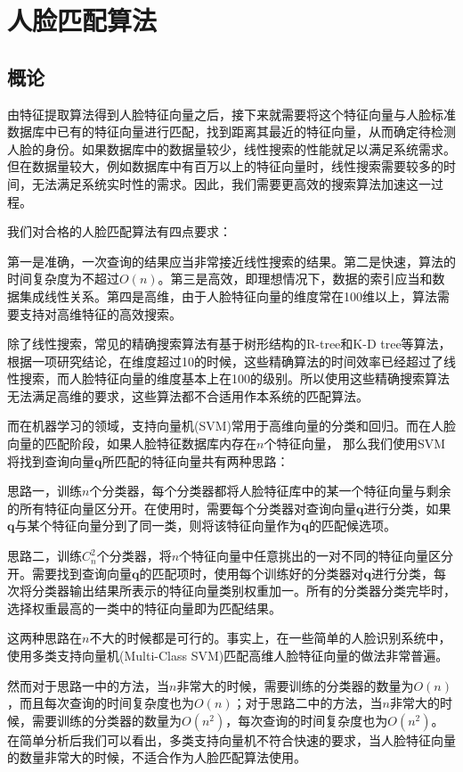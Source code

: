 \chapter{人脸匹配算法}

\section{概论}

由特征提取算法得到人脸特征向量之后，接下来就需要将这个特征向量与人脸标准数据库中已有的特征向量进行匹配，找到距离其最近的特征向量，从而确定待检测人脸的身份。如果数据库中的数据量较少，线性搜索的性能就足以满足系统需求。但在数据量较大，例如数据库中有百万以上的特征向量时，线性搜索需要较多的时间，无法满足系统实时性的需求。因此，我们需要更高效的搜索算法加速这一过程。

我们对合格的人脸匹配算法有四点要求：

第一是准确，一次查询的结果应当非常接近线性搜索的结果。第二是快速，算法的时间复杂度为不超过$O(n)$。第三是高效，即理想情况下，数据的索引应当和数据集成线性关系。第四是高维，由于人脸特征向量的维度常在100维以上，算法需要支持对高维特征的高效搜索。

除了线性搜索，常见的精确搜索算法有基于树形结构的R-tree和K-D tree等算法，根据一项研究结论，在维度超过10的时候，这些精确算法的时间效率已经超过了线性搜索\cite{weber1998quantitative}，而人脸特征向量的维度基本上在100的级别。所以使用这些精确搜索算法无法满足高维的要求，这些算法都不合适用作本系统的匹配算法。

而在机器学习的领域，支持向量机(SVM)常用于高维向量的分类和回归。而在人脸向量的匹配阶段，如果人脸特征数据库内存在$n$个特征向量， 那么我们使用SVM将找到查询向量$\mathbf{q}$所匹配的特征向量共有两种思路：

思路一，训练$n$个分类器，每个分类器都将人脸特征库中的某一个特征向量与剩余的所有特征向量区分开。在使用时，需要每个分类器对查询向量$\mathbf{q}$进行分类，如果$\mathbf{q}$与某个特征向量分到了同一类，则将该特征向量作为$\mathbf{q}$的匹配候选项。

思路二，训练$C_n^2$个分类器，将$n$个特征向量中任意挑出的一对不同的特征向量区分开。需要找到查询向量$\mathbf{q}$的匹配项时，使用每个训练好的分类器对$\mathbf{q}$进行分类，每次将分类器输出结果所表示的特征向量类别权重加一。所有的分类器分类完毕时，选择权重最高的一类中的特征向量即为匹配结果。

这两种思路在$n$不大的时候都是可行的。事实上，在一些简单的人脸识别系统中，使用多类支持向量机(Multi-Class SVM)匹配高维人脸特征向量的做法非常普遍。

然而对于思路一中的方法，当$n$非常大的时候，需要训练的分类器的数量为$O(n)$，而且每次查询的时间复杂度也为$O(n)$；对于思路二中的方法，当$n$非常大的时候，需要训练的分类器的数量为$O(n^2)$，每次查询的时间复杂度也为$O(n^2)$。在简单分析后我们可以看出，多类支持向量机不符合快速的要求，当人脸特征向量的数量非常大的时候，不适合作为人脸匹配算法使用。

